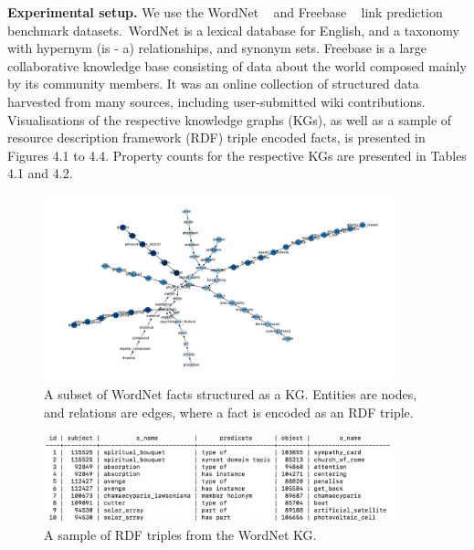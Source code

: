 \noindent \textbf{Experimental setup.} We use the WordNet \unskip ~\citep{miller1995wordnet} and Freebase \unskip ~\citep{bollacker2008freebase} link prediction benchmark datasets.\ WordNet is a lexical database for English, and a taxonomy with hypernym (is - a) relationships, and synonym sets. Freebase is a large collaborative knowledge base consisting of data about the world composed mainly by its community members. It was an online collection of structured data harvested from many sources, including user-submitted wiki contributions. Visualisations of the respective knowledge graphs (KGs), as well as a sample of resource description framework (RDF) triple encoded facts, is presented in Figures 4.1 to 4.4. Property counts for the respective KGs are presented in Tables 4.1 and 4.2. \par

\begin{figure}[H]
   	\centering
    	\includegraphics[width=0.9\textwidth, height=0.5\textwidth]{Wordnet}
	\captionsetup{justification=centering}
	\caption{A subset of WordNet facts structured as a KG. Entities are nodes, and relations are edges, where a fact is encoded as an RDF triple.}
\end{figure}

\begin{figure}[H]
   	\centering
    	\includegraphics[width=0.9\textwidth, height=0.3\textwidth]{wordnet_fact_sample}
	\captionsetup{justification=centering}
	\caption{A sample of RDF triples from the WordNet KG.}
\end{figure}

